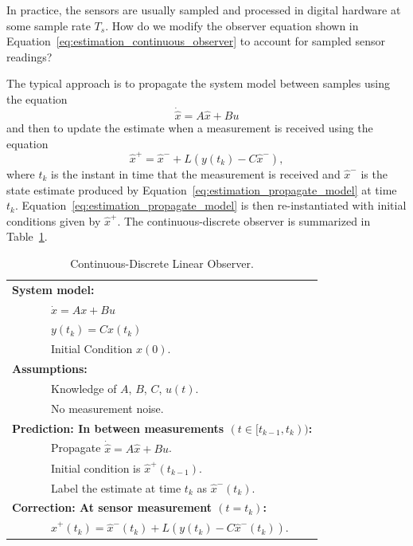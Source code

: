 {In practice, the sensors are usually sampled and processed in
digital hardware at some sample rate $T_s$.  How do we modify the
observer equation shown in
Equation~\eqref{eq:estimation_continuous_observer} to account for
sampled sensor readings?

The typical approach is to propagate the system model between
samples using the equation
\begin{equation}\label{eq:estimation_propagate_model}
\dot{\hat{x}} = A\hat{x} + Bu
\end{equation}
and then to update the estimate when a measurement is received using
the equation
\[
\hat{x}^+ = \hat{x}^- + L(y(t_k) - C\hat{x}^-),
\]
where $t_k$ is the instant in time that the measurement is received
and $\hat{x}^-$ is the state estimate produced by
Equation~\eqref{eq:estimation_propagate_model} at time $t_k$.
Equation~\eqref{eq:estimation_propagate_model} is then
re-instantiated with initial conditions given by $\hat{x}^+$. The
continuous-discrete observer is summarized in
Table~\ref{table:estimation_continuous-discrete}.

\begin{table}[hhhhtb]
\begin{center}
\begin{tabular}{l}
\hline
\textbf{System model:} \\
~~~~~~~$\dot{x}=Ax+Bu$ \\
~~~~~~~$y(t_k)=Cx(t_k)$ \\
~~~~~~~Initial Condition $x(0)$. \\
\textbf{Assumptions:} \\
~~~~~~~Knowledge of $A$, $B$, $C$, $u(t)$. \\
~~~~~~~No measurement noise. \\
\textbf{Prediction: In between measurements $(t\in[t_{k-1}, t_k))$:} \\
~~~~~~~Propagate $\dot{\hat{x}}=A\hat{x} + Bu$. \\
~~~~~~~Initial condition is $\hat{x}^+(t_{k-1}).$  \\
~~~~~~~Label the estimate at time $t_k$ as $\hat{x}^-(t_k)$.
\\
\textbf{Correction: At sensor measurement $(t=t_k)$:} \\
~~~~~~~$\hat{x}^+(t_k) = \hat{x}^-(t_k) + L\left( y(t_k) - C\hat{x}^-(t_k) \right).$ \\
\hline
\end{tabular}
\end{center}
\label{table:estimation_continuous-discrete}
\caption{Continuous-Discrete Linear Observer.}
\end{table}

}
